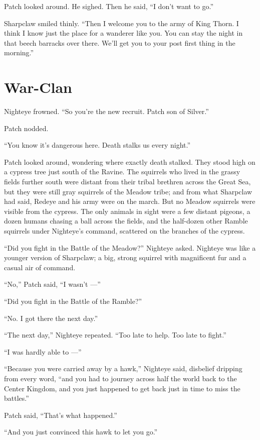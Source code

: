 \documentclass[ebook,oneside,openany,12pt]{memoir}
\begin{document}
Patch looked around. He sighed. Then he said, “I don’t want to go.”

Sharpclaw smiled thinly. “Then I welcome you to the army of King
Thorn. I think I know just the place for a wanderer like you. You can
stay the night in that beech barracks over there. We’ll get you to
your post first thing in the morning.”


\section{War-Clan}

Nighteye frowned. “So you’re the new recruit. Patch son of Silver.”

Patch nodded.

“You know it’s dangerous here. Death stalks us every night.”

Patch looked around, wondering where exactly death stalked. They stood
high on a cypress tree just south of the Ravine. The squirrels who
lived in the grassy fields further south were distant from their
tribal brethren across the Great Sea, but they were still gray
squirrels of the Meadow tribe; and from what Sharpclaw had said,
Redeye and his army were on the march. But no Meadow squirrels were
visible from the cypress. The only animals in sight were a few distant
pigeons, a dozen humans chasing a ball across the fields, and the
half-dozen other Ramble squirrels under Nighteye’s command, scattered
on the branches of the cypress.

“Did you fight in the Battle of the Meadow?” Nighteye asked. Nighteye
was like a younger version of Sharpclaw; a big, strong squirrel with
magnificent fur and a casual air of command.

“No,” Patch said, “I wasn’t —”

“Did you fight in the Battle of the Ramble?”

“No. I got there the next day.”

“The next day,” Nighteye repeated. “Too late to help. Too late to
fight.”

“I was hardly able to —”

“Because you were carried away by a hawk,” Nighteye said, disbelief
dripping from every word, “and you had to journey across half the
world back to the Center Kingdom, and you just happened to get back
just in time to miss the battles.”

Patch said, “That’s what happened.”

“And you just convinced this hawk to let you go.”
\end{document}
